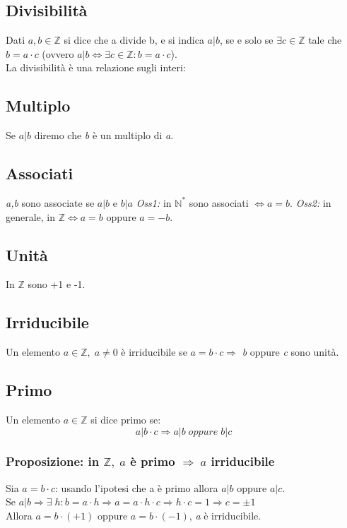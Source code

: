 \subsection{Divisibilità} 
Dati \(a,b\in\mathbb{Z}\) si dice che a divide b, e si indica \(a|b\), se e solo se \(\exists c\in\mathbb{Z}\) tale che \(b=a\cdot c\) (ovvero \(a|b\Leftrightarrow\exists c\in\mathbb{Z}: b=a\cdot c\)).
\\La divisibilità è una relazione sugli interi:

\subsection{Multiplo} 
Se \(a|b\) diremo che \textit{b} è un multiplo di \textit{a}.

\subsection{Associati}
\textit{a,b} sono associate se \(a|b\) e \(b|a\)
\newline\textit{Oss1:} in \(\mathbb{N^*}\) sono associati \(\Leftrightarrow a=b\).
\newline\textit{Oss2:} in generale, in \(\mathbb{Z}\Leftrightarrow a=b\) oppure \(a=-b\).

\subsection{Unità}
In \(\mathbb{Z}\) sono +1 e -1.

\subsection{Irriducibile}
Un elemento \(a\in\mathbb{Z}, \; a\neq 0\) è irriducibile se \(a=b\cdot c\Rightarrow\) \textit{b} oppure \textit{c} sono unità.

\subsection{Primo}
Un elemento \(a\in\mathbb{Z}\) si dice primo se:
\[a|b\cdot c\Rightarrow a|b \;oppure\; b|c\]

\subsubsection{Proposizione: in \(\mathbb{Z},\; a\) è primo \(\Rightarrow\;a\) irriducibile}
Sia \(a=b\cdot c\): usando l'ipotesi che a è primo allora \(a|b\) oppure \(a|c\).
\\
Se \(a|b \Rightarrow\exists\; h : b=a\cdot h \Rightarrow a = a\cdot h\cdot c \Rightarrow h\cdot c=1\Rightarrow c=\pm 1\)
\\
Allora \(a=b\cdot (+1)\) oppure \(a=b\cdot (-1)\), \textit{a} è irriducibile.

